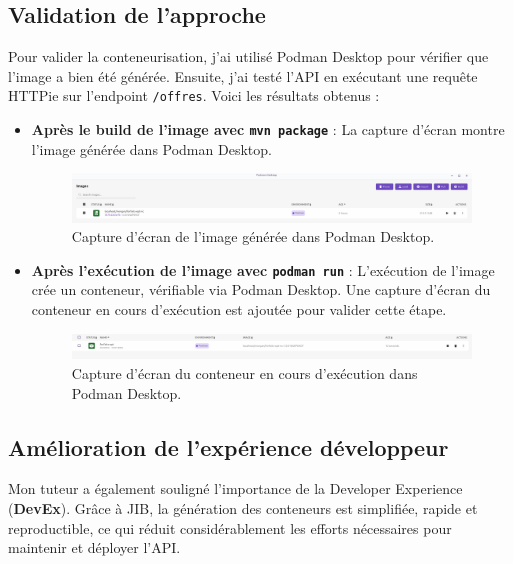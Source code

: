 \documentclass{article}
\begin{document}
	\subsection{Validation de l'approche}
	
	Pour valider la conteneurisation, j'ai utilisé Podman Desktop pour vérifier que l'image a bien été générée. Ensuite, j'ai testé l'API en exécutant une requête HTTPie sur l'endpoint \texttt{/offres}. Voici les résultats obtenus :
	\begin{itemize}
		\item \textbf{Après le build de l'image avec \texttt{mvn package}} : La capture d'écran montre l'image générée dans Podman Desktop.
		\begin{figure}[h!]
			\centering
			\includegraphics[width=1\textwidth]{asset/image_podman.png}
			\caption{Capture d'écran de l'image générée dans Podman Desktop.}
			\label{fig:image_podman}
		\end{figure}
		
		\item \textbf{Après l'exécution de l'image avec \texttt{podman run}} : L'exécution de l'image crée un conteneur, vérifiable via Podman Desktop. Une capture d'écran du conteneur en cours d'exécution est ajoutée pour valider cette étape.
		\begin{figure}[h!]
			\centering
			\includegraphics[width=1\textwidth]{asset/conteneur_podman.png}
			\caption{Capture d'écran du conteneur en cours d'exécution dans Podman Desktop.}
			\label{fig:conteneur_podman}
		\end{figure}
	\end{itemize}
	\subsection*{Amélioration de l'expérience développeur}
	
	Mon tuteur a également souligné l'importance de la Developer Experience (\textbf{DevEx}). Grâce à JIB, la génération des conteneurs est simplifiée, rapide et reproductible, ce qui réduit considérablement les efforts nécessaires pour maintenir et déployer l'API.
	
\end{document}
